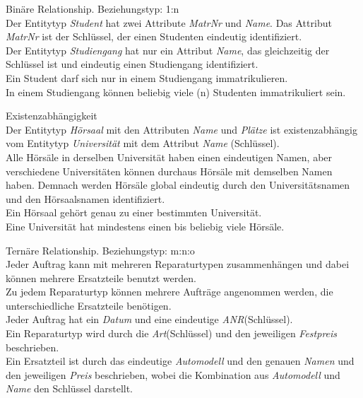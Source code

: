 \documentclass[ngerman]{gdb-aufgabenblatt}
\begin{document}
\begin{compactenum}[(a)]
	\item Bin\"are Relationship. Beziehungstyp: 1:n\\ 
	Der Entitytyp  \textit{Student} hat zwei Attribute \textit{MatrNr} und \textit{Name}. Das Attribut \textit{MatrNr} ist der Schl\"ussel, der einen Studenten eindeutig identifiziert.\\
	Der Entitytyp \textit{Studiengang} hat nur ein Attribut \textit{Name}, das gleichzeitig der Schl\"ussel ist und eindeutig einen Studiengang identifiziert.\\
	Ein Student darf sich nur in einem Studiengang immatrikulieren.\\
	In einem Studiengang k\"onnen beliebig viele (n) Studenten immatrikuliert sein.\\
	\item Existenzabh\"angigkeit\\
	Der Entitytyp \textit{H\"orsaal} mit den Attributen \textit{Name} und \textit{Pl\"atze} ist existenzabh\"angig vom Entitytyp \textit{Universit\"at} mit dem Attribut \textit{Name} (Schl\"ussel).\\ 
	Alle H\"ors\"ale in derselben Universit\"at haben einen eindeutigen Namen, aber verschiedene Universit\"aten k\"onnen durchaus H\"ors\"ale mit demselben Namen haben. Demnach werden H\"ors\"ale global eindeutig durch den Universit\"atsnamen und den H\"orsaalsnamen identifiziert.\\
	Ein H\"orsaal geh\"ort genau zu einer bestimmten Universit\"at.\\
	Eine Universit\"at hat mindestens einen bis beliebig viele H\"ors\"ale.\\
	\item Tern\"are Relationship. Beziehungstyp: m:n:o\\
	Jeder Auftrag kann mit mehreren Reparaturtypen zusammenh\"angen und dabei k\"onnen mehrere Ersatzteile benutzt werden.\\
	Zu jedem Reparaturtyp k\"onnen mehrere Auftr\"age angenommen werden, die unterschiedliche Ersatzteile ben\"otigen.\\
	Jeder Auftrag hat ein \textit{Datum} und eine eindeutige \textit{ANR}(Schl\"ussel).\\
	Ein Reparaturtyp wird durch die \textit{Art}(Schl\"ussel) und den jeweiligen \textit{Festpreis} beschrieben.\\
	Ein Ersatzteil ist durch das eindeutige \textit{Automodell} und den genauen \textit{Namen} und den jeweiligen \textit{Preis} beschrieben, wobei die Kombination aus  \textit{Automodell} und  \textit{Name} den Schl\"ussel darstellt.\\

\end{compactenum}
\end{document}
